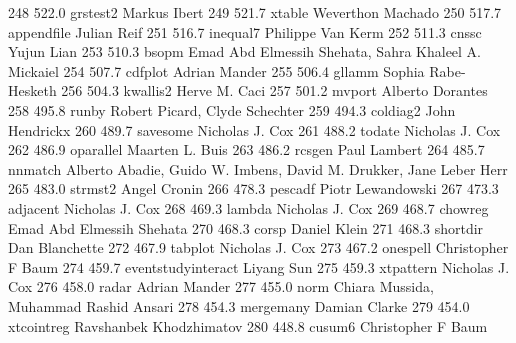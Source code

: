    248    522.0    grstest2      Markus Ibert                            
   249    521.7    xtable        Weverthon Machado                       
   250    517.7    appendfile    Julian Reif                             
   251    516.7    inequal7      Philippe Van Kerm                       
   252    511.3    cnssc         Yujun Lian                              
   253    510.3    bsopm         Emad Abd Elmessih Shehata, Sahra        
                                   Khaleel A. Mickaiel                     
   254    507.7    cdfplot       Adrian Mander                           
   255    506.4    gllamm        Sophia Rabe-Hesketh                     
   256    504.3    kwallis2      Herve M. Caci                           
   257    501.2    mvport        Alberto Dorantes                        
   258    495.8    runby         Robert Picard, Clyde Schechter          
   259    494.3    coldiag2      John Hendrickx                          
   260    489.7    savesome      Nicholas J. Cox                         
   261    488.2    todate        Nicholas J. Cox                         
   262    486.9    oparallel     Maarten L. Buis                         
   263    486.2    rcsgen        Paul Lambert                            
   264    485.7    nnmatch       Alberto Abadie, Guido W. Imbens, David  
                                   M. Drukker, Jane Leber Herr             
   265    483.0    strmst2       Angel Cronin                            
   266    478.3    pescadf       Piotr Lewandowski                       
   267    473.3    adjacent      Nicholas J. Cox                         
   268    469.3    lambda        Nicholas J. Cox                         
   269    468.7    chowreg       Emad Abd Elmessih Shehata               
   270    468.3    corsp         Daniel Klein                            
   271    468.3    shortdir      Dan Blanchette                          
   272    467.9    tabplot       Nicholas J. Cox                         
   273    467.2    onespell      Christopher F Baum                      
   274    459.7    eventstudyinteract  Liyang Sun                              
   275    459.3    xtpattern     Nicholas J. Cox                         
   276    458.0    radar         Adrian Mander                           
   277    455.0    norm          Chiara Mussida, Muhammad Rashid Ansari  
   278    454.3    mergemany     Damian Clarke                           
   279    454.0    xtcointreg    Ravshanbek Khodzhimatov                 
   280    448.8    cusum6        Christopher F Baum                      
